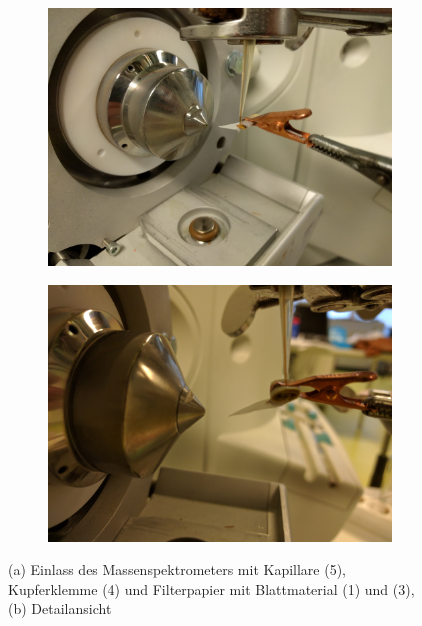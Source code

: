 \documentclass[12pt,a4paper]{article}
\begin{document}
\begin{figure}[htbp]
  \begin{subfigure}[b]{0.5\textwidth}
    \includegraphics[width=\textwidth]{figures/Kapitel4/VWA_MSLeafspray_Detail1.jpg}
    \caption{}
    \label{fig:MSLeafsprayDetail1}
  \end{subfigure}
  \hfill
  \begin{subfigure}[b]{0.5\textwidth}
    \includegraphics[width=\textwidth]{figures/Kapitel4/VWA_MSLeafspray_Detail2.jpg}
    \caption{}
    \label{fig:MSLeafsprayDetail2}
  \end{subfigure}
  \caption[MS Leafspray Versuchsaufbau Detailfotos, Quelle: Autor]{(a) Einlass des Massenspektrometers mit Kapillare (5), Kupferklemme (4) und Filterpapier mit Blattmaterial (1) und (3), (b) Detailansicht}
  \label{fig:MSLeafsprayDetail}
\end{figure}
\end{document}
